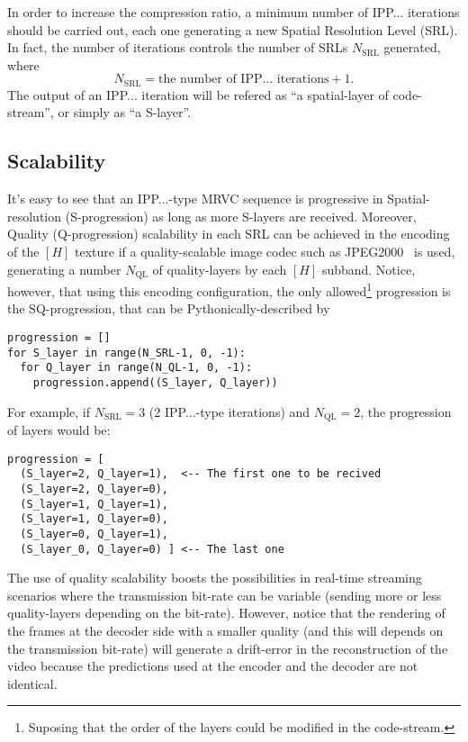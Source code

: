 In order to increase the compression ratio, a minimum number of
IPP... iterations should be carried out, each one generating a new
Spatial Resolution Level (SRL). In fact, the number of iterations
controls the number of SRLs $N_{\text{SRL}}$ generated, where
\begin{equation}
  N_{\text{SRL}} = \text{the number of IPP... iterations} + 1.
\end{equation}
The output of an IPP... iteration will be refered as ``a
spatial-layer of code-stream'', or simply as ``a S-layer''.

\subsection{Scalability}
It's easy to see that an IPP...-type MRVC sequence is progressive in
Spatial-resolution (S-progression) as long as more S-layers are
received. Moreover, Quality (Q-progression) scalability in each SRL
can be achieved in the encoding of the $[H]$ texture if a
quality-scalable image codec such as
JPEG2000~\cite{taubman2002jpeg2000} is used, generating a number
$N_{\text{QL}}$ of quality-layers by each $[H]$ subband. Notice,
however, that using this encoding configuration, the only
allowed\footnote{Suposing that the order of the layers could be
modified in the code-stream.} progression is the SQ-progression, that
can be Pythonically-described by
\begin{verbatim}
progression = []
for S_layer in range(N_SRL-1, 0, -1):
  for Q_layer in range(N_QL-1, 0, -1):
    progression.append((S_layer, Q_layer))
\end{verbatim}

For example, if $N_{\text{SRL}}=3$ (2 IPP...-type iterations) and
$N_{\text{QL}}=2$, the progression of layers would be:
\begin{verbatim}
progression = [
  (S_layer=2, Q_layer=1),  <-- The first one to be recived
  (S_layer=2, Q_layer=0),
  (S_layer=1, Q_layer=1),
  (S_layer=1, Q_layer=0),
  (S_layer=0, Q_layer=1),
  (S_layer_0, Q_layer=0) ] <-- The last one
\end{verbatim}

The use of quality scalability boosts the possibilities in real-time
streaming scenarios where the transmission bit-rate can be variable
(sending more or less quality-layers depending on the
bit-rate). However, notice that the rendering of the
frames at the decoder side with a smaller quality (and this will
depends on the transmission bit-rate) will generate a drift-error in
the reconstruction of the video because the predictions used at the
encoder and the decoder are not identical.

